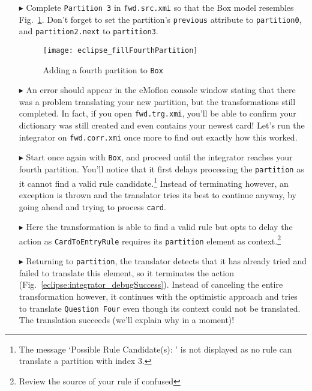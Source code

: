 \begin{itemize}

\item[$\blacktriangleright$] Complete \texttt{Partition 3} in \texttt{fwd.src.xmi} so that the Box model resembles Fig.~\ref{eclipse:fourthPartitionStart}.
Don't forget to set the partition's \texttt{previous} attribute to \texttt{partition0}, and \texttt{partition2.next} to \texttt{partition3}.

\begin{figure}[htbp]
\begin{center}
  \texttt{[image: eclipse\_fillFourthPartition]}
  \caption{Adding a fourth partition to \texttt{Box}}
  \label{eclipse:fourthPartitionStart}
\end{center}
\end{figure}

\item[$\blacktriangleright$] An error should appear in the eMoflon console window stating that there was a problem translating your new partition, but the
transformations still completed. In fact, if you open \texttt{fwd.trg.xmi}, you'll be able to confirm your dictionary was still created and even
contains your newest card! Let's run the integrator on \texttt{fwd.corr.xmi} once more to find out exactly how this worked.

\item[$\blacktriangleright$] Start once again with \texttt{Box}, and proceed until the integrator reaches your fourth partition. You'll notice that it
first delays processing the \texttt{partition} as it cannot find a valid rule candidate.\footnote{The message `Possible Rule Candidate(s): ' is not displayed
as no rule can translate a partition with index 3.} Instead of terminating however, an exception is thrown and the translator tries its best to continue anyway,
by going ahead and trying to process \texttt{card}.

\item[$\blacktriangleright$] Here the transformation is able to find a valid rule but opts to delay the action as \texttt{CardToEntryRule} requires its
\texttt{partition} element as context.\footnote{Review the source of your rule if confused}

\item[$\blacktriangleright$] Returning to \texttt{partition}, the translator detects that it has already tried and failed to translate this element, so it
terminates the action (Fig.~\ref{eclipse:integrator_debugSuccess}). Instead of canceling the entire transformation however, it continues with the optimistic
approach and tries to translate \texttt{Question Four} even though its context could not be translated. The translation succeeds (we'll explain why in a
moment)!


\end{itemize}
